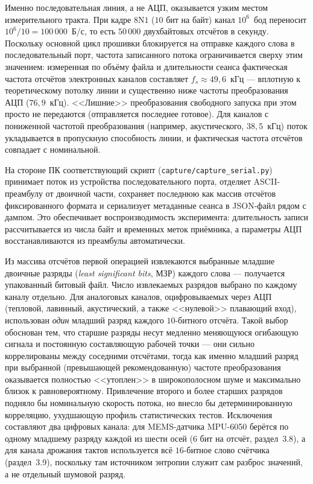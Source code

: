 Именно последовательная линия, а не АЦП, оказывается узким местом измерительного
тракта. При кадре $8\text{N}1$ ($10$ бит на байт) канал $10^6$~бод переносит
$10^6/10 = 100\,000$~Б/с, то есть $50\,000$ двухбайтовых отсчётов в секунду.
Поскольку основной цикл прошивки блокируется на отправке каждого слова в
последовательный порт, частота записанного потока ограничивается сверху этим
значением: измеренная по объёму файла и длительности сеанса фактическая частота
отсчётов электронных каналов составляет $f_s\approx 49{,}6$~кГц --- вплотную к
теоретическому потолку линии и существенно ниже частоты преобразования АЦП
($76{,}9$~кГц). <<Лишние>> преобразования свободного запуска при этом просто не
передаются (отправляется последнее готовое). Для каналов с пониженной частотой
преобразования (например, акустического, $38{,}5$~кГц) поток укладывается в
пропускную способность линии, и фактическая частота отсчётов совпадает с
номинальной.

На стороне ПК соответствующий скрипт (\texttt{capture/capture\_serial.py}) принимает
поток из устройства последовательного порта, отделяет ASCII-преамбулу от двоичной части,
сохраняет последнюю как массив отсчётов фиксированного формата и сериализует
метаданные сеанса в JSON-файл рядом с дампом. Это обеспечивает воспроизводимость
эксперимента: длительность записи рассчитывается из числа байт и временных меток
приёмника, а параметры АЦП восстанавливаются из преамбулы автоматически.


Из массива отсчётов первой операцией извлекаются выбранные младшие двоичные разряды
(\textit{least significant bits}, МЗР) каждого слова --- получается упакованный битовый
файл. Число извлекаемых разрядов выбрано по каждому каналу отдельно. Для
аналоговых каналов, оцифровываемых через АЦП (тепловой, лавинный, акустический,
а также <<нулевой>> плавающий вход), использован \emph{один} младший разряд каждого
$10$-битного отсчёта. Такой выбор обоснован тем, что старшие разряды несут
медленно меняющуюся огибающую сигнала и постоянную составляющую рабочей точки ---
они сильно коррелированы между соседними отсчётами, тогда как именно младший
разряд при выбранной (превышающей рекомендованную) частоте преобразования
оказывается полностью <<утоплен>> в широкополосном шуме и максимально близок к
равновероятному. Привлечение второго и более старших разрядов подняло бы
номинальную скорость потока, но внесло бы детерминированную корреляцию, ухудшающую
профиль статистических тестов. Исключения составляют два цифровых канала: для
MEMS-датчика MPU-6050 берётся по одному младшему разряду каждой из шести осей
($6$ бит на отсчёт, раздел~3.8), а для канала дрожания тактов используется всё
$16$-битное слово счётчика (раздел~3.9), поскольку там источником энтропии служит
сам разброс значений, а не отдельный шумовой разряд.

